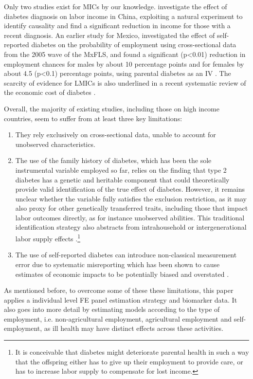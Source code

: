 \documentclass[12pt,english,british]{article}
\begin{document}
Only two studies exist for \ac{MICs} by our knowledge. \citet{Liu2014} investigate the effect of diabetes diagnosis on labor income in China, exploiting a natural experiment to identify causality and find a significant reduction in income for those with a recent diagnosis. An earlier study for Mexico, investigated the effect of self-reported diabetes on the probability of employment using cross-sectional data from the 2005 wave of the \ac{MxFLS}, and found a significant (p<0.01) reduction in employment chances for males by about 10 percentage points and for females by about 4.5 (p<0.1) percentage points, using parental diabetes as an \ac{IV} \citep{Seuring2015}. The scarcity of evidence for \ac{LMICs} is also underlined in a recent systematic review of the economic cost of diabetes \citep{Seuring2015a}. 


Overall, the majority of existing studies, including those on high income countries, seem to suffer from at least three key limitations: 
\begin{enumerate}
\item  They rely exclusively on cross-sectional data, unable to account for unobserved characteristics.
\item The use of the family history of diabetes, which has been the sole instrumental variable employed so far, relies on the finding that type 2 diabetes has a genetic and heritable component that could theoretically provide valid identification of the true effect of diabetes. However, it remains unclear whether the variable fully satisfies the exclusion restriction, as it may also proxy for other genetically transferred traits, including those that impact labor outcomes directly, as for instance unobserved abilities. This traditional identification strategy also abstracts from intrahousehold or intergenerational labor supply effects \citep{Seuring2015}.\footnote{It is conceivable that diabetes might deteriorate parental health in such a way that the offspring either has to give
up their employment to provide care, or has to increase labor supply to compensate for lost income.}
\item The use of self-reported diabetes can introduce non-classical measurement error due to systematic misreporting which has been shown to cause estimates of economic impacts to be potentially biased and overstated  \citep{Cawley2015,ONeill2013,Perks2015}.
\end{enumerate}


As mentioned before, to overcome some of these these limitations, this paper applies a individual level \ac{FE} panel estimation strategy and biomarker data. It also goes into more detail by estimating models according to the type of employment, i.e. non-agricultural employment, agricultural employment and self-employment, as ill health may have distinct effects across these activities.
\end{document}
